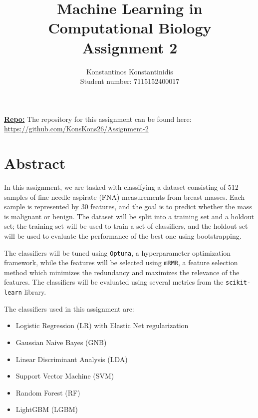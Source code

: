 \documentclass[12pt]{article}
\title{%
    Machine Learning in Computational Biology \\
    \Large Assignment 2
    }
\author{%
    Konstantinos Konstantinidis \\
    Student number: 7115152400017
    }
\begin{document}
\maketitle

\vspace{0.5in}

\textbf{\underline{Repo:}} The repository for this assignment can be found %
here: \\
\url{https://github.com/KonsKons26/Assignment-2}

\vspace{0.5in}

\tableofcontents
\clearpage



\section{Abstract}

In this assignment, we are tasked with classifying a dataset consisting of 512
samples of fine needle aspirate (FNA) measurements from breast masses. Each
sample is represented by 30 features, and the goal is to predict whether the
mass is malignant or benign. The dataset will be split into a training set and a
holdout set; the training set will be used to train a set of classifiers, and
the holdout set will be used to evaluate the performance of the best one using
bootstrapping.

The classifiers will be tuned using \texttt{Optuna}, a hyperparameter
optimization framework, while the features will be selected using \texttt{mRMR},
a feature selection method which minimizes the redundancy and maximizes the
relevance of the features. The classifiers will be evaluated using several
metrics from the \texttt{scikit-learn} library.

The classifiers used in this assignment are:

\begin{itemize}
    \item Logistic Regression (LR) with Elastic Net regularization
    \item Gaussian Naive Bayes (GNB)
    \item Linear Discriminant Analysis (LDA)
    \item Support Vector Machine (SVM)
    \item Random Forest (RF)
    \item LightGBM (LGBM)
\end{itemize}
\end{document}
